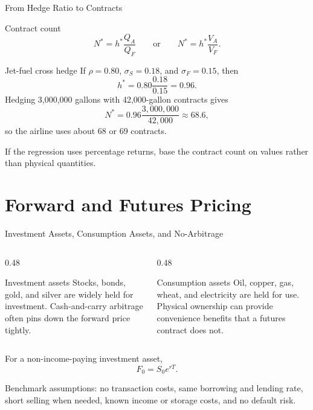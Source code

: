 \documentclass[aspectratio=169,11pt]{beamer}
\begin{document}
\begin{frame}{From Hedge Ratio to Contracts}
    \footnotesize
    \begin{block}{Contract count}
        \[
            N^*=h^*\frac{Q_A}{Q_F}
            \qquad \text{or} \qquad
            N^*=h^*\frac{V_A}{V_F}.
        \]
    \end{block}

    \begin{exampleblock}{Jet-fuel cross hedge}
        If $\rho=0.80$, $\sigma_S=0.18$, and $\sigma_F=0.15$, then
        \[
            h^*=0.80\frac{0.18}{0.15}=0.96.
        \]
        Hedging 3,000,000 gallons with 42,000-gallon contracts gives
        \[
            N^*=0.96\frac{3{,}000{,}000}{42{,}000}\approx 68.6,
        \]
        so the airline uses about 68 or 69 contracts.
    \end{exampleblock}

    If the regression uses percentage returns, base the contract count on values rather than physical quantities.
\end{frame}

\section{Forward and Futures Pricing}

\begin{frame}{Investment Assets, Consumption Assets, and No-Arbitrage}
    \begin{columns}[T]
        \begin{column}{0.48\textwidth}
            \begin{block}{Investment assets}
                Stocks, bonds, gold, and silver are widely held for investment.
                Cash-and-carry arbitrage often pins down the forward price tightly.
            \end{block}
        \end{column}
        \begin{column}{0.48\textwidth}
            \begin{block}{Consumption assets}
                Oil, copper, gas, wheat, and electricity are held for use.
                Physical ownership can provide convenience benefits that a futures contract does not.
            \end{block}
        \end{column}
    \end{columns}

    \vspace{0.4em}
    For a non-income-paying investment asset,
    \[
        F_0=S_0e^{rT}.
    \]

    Benchmark assumptions: no transaction costs, same borrowing and lending rate, short selling when needed, known income or storage costs, and no default risk.
\end{frame}
\end{document}
